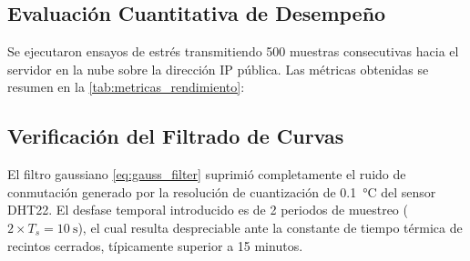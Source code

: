\documentclass[conference]{IEEEtran}
\begin{document}
\subsection{Evaluación Cuantitativa de Desempeño}
Se ejecutaron ensayos de estrés transmitiendo 500 muestras consecutivas hacia el servidor en la nube sobre la dirección IP pública. Las métricas obtenidas se resumen en la \autoref{tab:metricas_rendimiento}:

\begin{table}[htbp]
\centering
\caption{Métricas de rendimiento telemático del sistema sobre IP pública.}
\label{tab:metricas_rendimiento}
\end{table}

\subsection{Verificación del Filtrado de Curvas}
El filtro gaussiano \eqref{eq:gauss_filter} suprimió completamente el ruido de conmutación generado por la resolución de cuantización de \SI{0.1}{\celsius} del sensor DHT22. El desfase temporal introducido es de 2 periodos de muestreo ($2 \times T_s = \SI{10}{\second}$), el cual resulta despreciable ante la constante de tiempo térmica de recintos cerrados, típicamente superior a 15 minutos.
\end{document}
